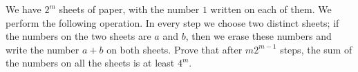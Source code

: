 We have $2^m$ sheets of paper, with the number $1$ written on each of them. We perform the following operation. In every step we choose two distinct sheets; if the numbers on the two sheets are $a$ and $b$, then we erase these numbers and write the number $a+b$ on both sheets. Prove that after $m2^{m-1}$ steps, the sum of the numbers on all the sheets is at least $4^m$.
